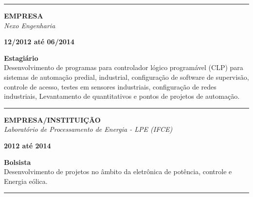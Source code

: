 \documentclass[12pt, a4paper]{article}
\newcommand{\LlinhaM}{1pt} 	 %
\newcommand{\TlinhaM}{17cm}		 %
\begin{document}
\begin{center}
	\rule{\TlinhaM}{\LlinhaM}
\end{center}

\begin{multicols}{2}
	\begin{flushleft}
		\textbf{EMPRESA}\\
		\textit{Nexo Engenharia}\\
	\end{flushleft}
	\vfill
	\begin{flushright}
		\textbf{12/2012 até 06/2014}\\
	\end{flushright}
\end{multicols}
\begin{flushleft}
	\textbf{Estagiário}\\
	Desenvolvimento de programas para controlador lógico programável (CLP) para sistemas de automação predial, industrial, configuração de software de supervisão, controle de acesso, testes em sensores industriais, configuração de redes industriais, Levantamento de quantitativos e pontos de projetos de automação.\\
\end{flushleft}

\begin{center}
	\rule{\TlinhaM}{\LlinhaM}
\end{center}

\begin{multicols}{2}
	\begin{flushleft}
		\textbf{EMPRESA/INSTITUIÇÃO}\\
		\textit{Laboratório de Processamento de Energia - LPE (IFCE)}\\
	\end{flushleft}
	\vfill
	\begin{flushright}
		\textbf{2012 até 2014}\\
	\end{flushright}
\end{multicols}
\begin{flushleft}
	\textbf{Bolsista}\\
	Desenvolvimento de projetos no âmbito da eletrônica de potência, controle e Energia eólica.\\
\end{flushleft}

\begin{center}
	\rule{\TlinhaM}{\LlinhaM}
\end{center}
\end{document}
